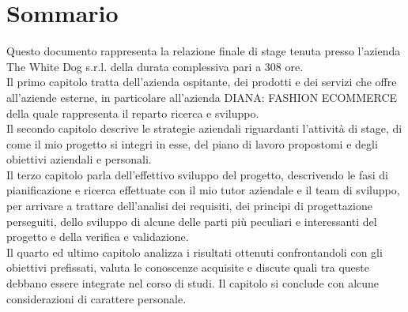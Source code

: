 \cleardoublepage
{}
{}
\begingroup
\let\clearpage\relax
\let\cleardoublepage\relax
\let\cleardoublepage\relax

\chapter*{Sommario}

Questo documento rappresenta la relazione finale di stage tenuta presso l'azienda The White Dog s.r.l. della durata complessiva pari a 308 ore. \\
Il primo capitolo tratta dell'azienda ospitante, dei prodotti e dei servizi che offre all’aziende esterne, in particolare all’azienda DIANA: FASHION ECOMMERCE della quale rappresenta il reparto ricerca e sviluppo. \\
Il secondo capitolo descrive le strategie aziendali riguardanti l’attività di stage, di come il mio progetto si integri in esse, del piano di lavoro propostomi e degli obiettivi aziendali e personali. \\
Il terzo capitolo parla dell'effettivo sviluppo del progetto, descrivendo le fasi di pianificazione e ricerca effettuate con il mio tutor aziendale e il team di sviluppo, per arrivare a trattare dell'analisi dei requisiti, dei principi di progettazione perseguiti, dello sviluppo di alcune delle parti più peculiari e interessanti del progetto e della verifica e validazione. \\
Il quarto ed ultimo capitolo analizza i risultati ottenuti confrontandoli con gli obiettivi prefissati, valuta le conoscenze acquisite e discute quali tra queste debbano essere integrate nel corso di studi. Il capitolo si conclude con alcune considerazioni di carattere personale.

%
%

\endgroup			


